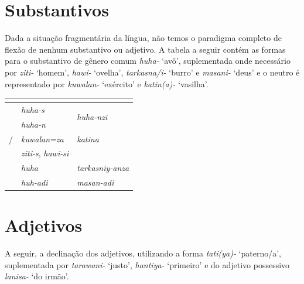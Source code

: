 \section{Substantivos}

Dada a situação fragmentária da língua, não temos o paradigma
completo de flexão de nenhum substantivo ou adjetivo. A tabela a seguir contém
as formas para o substantivo de gênero comum \emph{huha-} `avô', suplementada
onde necessário por \emph{ziti-} `homem', \emph{hawi-} `ovelha', \emph{tarkasna\slash{}i-}
`burro' e \emph{masani-} `deus' e o neutro é representado por \emph{kuwalan-}
`exército' e \emph{katin{(a)}-} `vasilha'.


\begin{center}
	\begin{tabular}[c]{lll}
		\toprule
		                      & \Sg{}\emph{}                  & \Pl{}\emph{}                       \\
		\midrule
		\Nom{} \Com{}         & \emph{huha-s}                 & \multirow{2}{4em}{\emph{huha-nzi}} \\
		\Acu{} \Com{}         & \emph{huha-n}                 &                                    \\
		\Nom{}/\Acu{} \Neut{} & \emph{kuwalan=za}             & \emph{katina}                      \\
		\Gen{}                & \emph{ziti-s}, \emph{hawi-si} &                                    \\
		\Dat{}                & \emph{huha}                   & \emph{tarkasniy-anza}              \\
		\Abl{}                & \emph{huh-adi}                & \emph{masan-adi}                   \\
		\bottomrule
	\end{tabular}
\end{center}


\section{Adjetivos}
A seguir, a declinação dos adjetivos, utilizando a forma \emph{tati{(ya)}-}
`paterno\slash{}a', suplementada por \emph{tarawani-} `justo',
\emph{hanti{ya}-} `primeiro' e do adjetivo possessivo \emph{lanisa-} `do irmão'.

